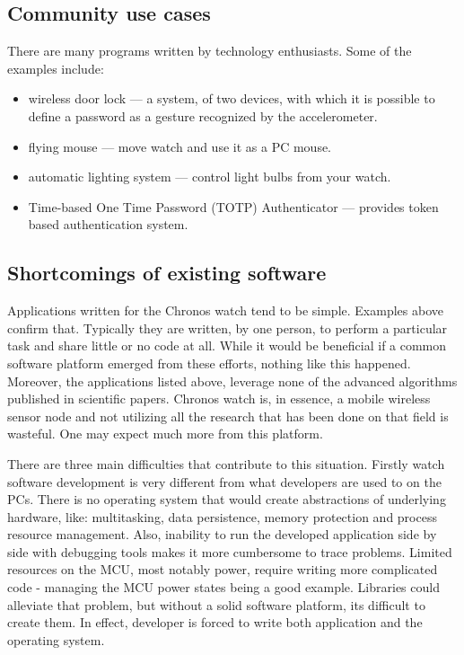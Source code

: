 \subsection{Community use cases}
There are many programs written by technology enthusiasts. Some of the
examples include:

\begin{itemize}
  \item wireless door lock --- a system, of two devices, with which it
    is possible to define a password as a gesture recognized by the
    accelerometer.
  \item flying mouse --- move watch and use it as a PC mouse.
  \item automatic lighting system --- control light bulbs from your
    watch.
  \item Time-based One Time Password (TOTP) Authenticator --- provides
    token based authentication system. %
\end{itemize}

\subsection{Shortcomings of existing software}

Applications written for the Chronos watch tend to be simple. Examples
above confirm that. Typically they are written, by one person, to
perform a particular task and share little or no code at all.  While
it would be beneficial if a common software platform emerged from
these efforts, nothing like this happened. Moreover, the
applications listed above, leverage none of the advanced algorithms published in
scientific papers. Chronos watch is, in essence, a mobile wireless
sensor node and not utilizing all the research that has been done on
that field is wasteful. One may expect much more from this platform.

There are three main difficulties that contribute to this situation.
Firstly watch software development is very different from what
developers are used to on the PCs. There is no operating system that
would create abstractions of underlying hardware, like: multitasking,
data persistence, memory protection and process resource management.
Also, inability to run the developed application side by side with
debugging tools makes it more cumbersome to trace problems.  Limited
resources on the MCU, most notably power, require writing more
complicated code - managing the MCU power states being a good example.
Libraries could alleviate that problem, but without a solid software
platform, its difficult to create them. In effect, developer is forced
to write both application and the operating system.

